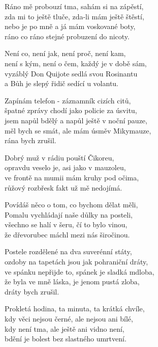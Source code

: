 
\ve{}
Ráno mě probouzí tma, sahám si na zápěstí,\\
zda mi to ještě tluče, zda-li mám ještě štěstí,\\
nebo je po mně a já mám voskované boty,\\
ráno co ráno stejné probuzení do nicoty.

\ve{}
Není co, není jak, není proč, není kam,\\
není s kým, není o čem, každý je v době sám,\\
vyzáblý Don Quijote sedlá svou Rosinantu\\
a Bůh je slepý řidič sedící u volantu.

\cho{}
Zapínám telefon - záznamník cizích citů,\\
špatné zprávy chodí jako policie za úsvitu,\\
jsem napůl bdělý a napůl ještě v noční pauze,\\
měl bych se smát, ale mám úsměv Mikymauze,\\
rána bych zrušil.\quad {} \quad {} \quad {}   

\ve{}
Dobrý muž v rádiu pouští Čikoreu,\\
opravdu veselo je, asi jako v mauzoleu,\\
ve frontě na mumii mám kruhy pod očima,\\
růžový rozbřesk fakt už mě nedojímá.

\ve{}
Povídáš něco o tom, co bychom dělat měli,\\
Pomalu vychládají naše důlky na posteli,\\
všechno se halí v šeru, čí to bylo vinou,\\
že dřevorubec máchl mezi nás širočinou.
  
\cho{} 
Postele rozdělené na dva suverénní státy,\\
ozdoby na tapetách jsou jak pohraniční dráty,\\
ve spánku nepřijde to, spánek je sladká mdloba,\\
že byla ve mně láska, je jenom pustá zloba,\\
dráty bych zrušil.

\ve{}
Prokletá hodina, ta minuta, ta krátká chvíle,\\
kdy věci nejsou černé, ale nejsou ani bílé,\\
kdy není tma, ale ještě ani vidno není,\\
bdění je bolest bez slastného umrtvení.

